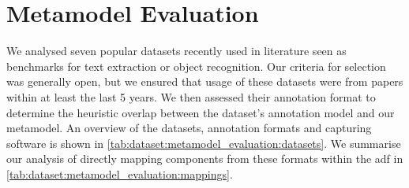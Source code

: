 \section{Metamodel Evaluation}
\label{sec:dataset:architecture_evaluation}

We analysed seven popular datasets recently used in literature seen as benchmarks for text extraction or object recognition. Our criteria for selection was generally open, but we ensured that usage of these datasets were from papers within at least the last 5 years. We then assessed their annotation format to determine the heuristic overlap between the dataset's annotation model and our metamodel. An overview of the datasets, annotation formats and capturing software is shown in \cref{tab:dataset:metamodel_evaluation:datasets}. We summarise our analysis of directly mapping components from these formats within the \gls{adf} in \cref{tab:dataset:metamodel_evaluation:mappings}.

